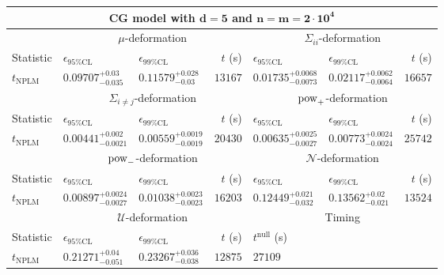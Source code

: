 \begin{tabular}{l|llr|llr}
	\toprule
	\multicolumn{7}{c}{{\bf CG model with $\mathbf{d=5}$ and $\mathbf{n=m=2\cdot10^{4}}$}} \\
	\toprule
	\multicolumn{1}{c}{} & \multicolumn{3}{c}{$\mu$-deformation} & \multicolumn{3}{c}{$\Sigma_{ii}$-deformation} \\
	Statistic & $\epsilon_{95\%\mathrm{CL}}$ & $\epsilon_{99\%\mathrm{CL}}$ & $t$ (s) & $\epsilon_{95\%\mathrm{CL}}$ & $\epsilon_{99\%\mathrm{CL}}$ & $t$ (s) \\
	\midrule
	$t_{\mathrm{NPLM}}$ & $0.09707_{-0.035}^{+0.03}$ & $0.11579_{-0.03}^{+0.028}$ & $13167$ & $0.01735_{-0.0073}^{+0.0068}$ & $0.02117_{-0.0064}^{+0.0062}$ & $16657$ \\
	\toprule
	\multicolumn{1}{c}{} & \multicolumn{3}{c}{$\Sigma_{i\neq j}$-deformation} & \multicolumn{3}{c}{$\rm{pow}_{+}$-deformation} \\
	Statistic & $\epsilon_{95\%\mathrm{CL}}$ & $\epsilon_{99\%\mathrm{CL}}$ & $t$ (s) & $\epsilon_{95\%\mathrm{CL}}$ & $\epsilon_{99\%\mathrm{CL}}$ & $t$ (s) \\
	\midrule
	$t_{\mathrm{NPLM}}$ & $0.00441_{-0.0021}^{+0.002}$ & $0.00559_{-0.0019}^{+0.0019}$ & $20430$ & $0.00635_{-0.0027}^{+0.0025}$ & $0.00773_{-0.0024}^{+0.0024}$ & $25742$ \\
	\toprule
	\multicolumn{1}{c}{} & \multicolumn{3}{c}{$\rm{pow}_{-}$-deformation} & \multicolumn{3}{c}{$\mathcal{N}$-deformation} \\
	Statistic & $\epsilon_{95\%\mathrm{CL}}$ & $\epsilon_{99\%\mathrm{CL}}$ & $t$ (s) & $\epsilon_{95\%\mathrm{CL}}$ & $\epsilon_{99\%\mathrm{CL}}$ & $t$ (s) \\
	\midrule
	$t_{\mathrm{NPLM}}$ & $0.00897_{-0.0027}^{+0.0024}$ & $0.01038_{-0.0023}^{+0.0023}$ & $16203$ & $0.12449_{-0.032}^{+0.021}$ & $0.13562_{-0.021}^{+0.02}$ & $13524$ \\
	\toprule
	\multicolumn{1}{c}{} & \multicolumn{3}{c}{$\mathcal{U}$-deformation} & \multicolumn{3}{c}{Timing} \\
	Statistic & $\epsilon_{95\%\mathrm{CL}}$ & $\epsilon_{99\%\mathrm{CL}}$ & $t$ (s) & $t^{\mathrm{null}}$ (s) \\
	\midrule
	$t_{\mathrm{NPLM}}$ & $0.21271_{-0.051}^{+0.04}$ & $0.23267_{-0.038}^{+0.036}$ & $12875$ & $27109$ \\
	\bottomrule
\end{tabular}